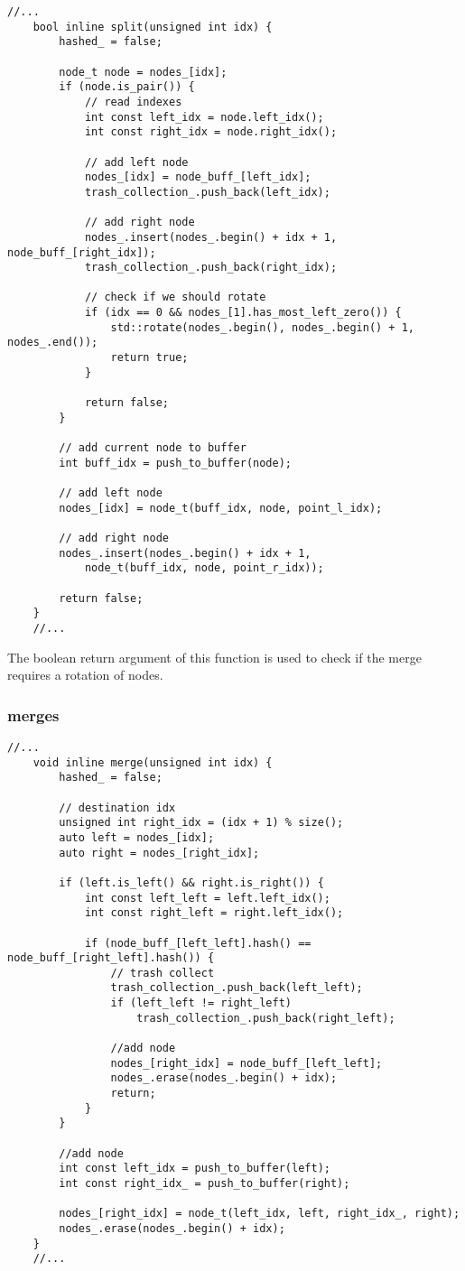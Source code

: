 \documentclass[11pt]{article}
\begin{document}
\begin{lstlisting}[style=CStyle]
	//...
	bool inline split(unsigned int idx) {
		hashed_ = false;

		node_t node = nodes_[idx];
		if (node.is_pair()) {
			// read indexes
			int const left_idx = node.left_idx();
			int const right_idx = node.right_idx();

			// add left node
			nodes_[idx] = node_buff_[left_idx];
			trash_collection_.push_back(left_idx);

			// add right node
			nodes_.insert(nodes_.begin() + idx + 1, node_buff_[right_idx]);
			trash_collection_.push_back(right_idx);

			// check if we should rotate
			if (idx == 0 && nodes_[1].has_most_left_zero()) {
				std::rotate(nodes_.begin(), nodes_.begin() + 1, nodes_.end());
				return true; 
			}

			return false;
		}

		// add current node to buffer
		int buff_idx = push_to_buffer(node);

		// add left node
		nodes_[idx] = node_t(buff_idx, node, point_l_idx);

		// add right node
		nodes_.insert(nodes_.begin() + idx + 1,
			node_t(buff_idx, node, point_r_idx));
		
		return false;
	}
	//...
\end{lstlisting}

The boolean return argument of this function is used to check if the merge requires a rotation of nodes.

\subsubsection{merges}

\begin{lstlisting}[style=CStyle]
	//...
	void inline merge(unsigned int idx) {
		hashed_ = false;

		// destination idx
		unsigned int right_idx = (idx + 1) % size();
		auto left = nodes_[idx];
		auto right = nodes_[right_idx];

		if (left.is_left() && right.is_right()) {
			int const left_left = left.left_idx();
			int const right_left = right.left_idx();

			if (node_buff_[left_left].hash() == node_buff_[right_left].hash()) {
				// trash collect
				trash_collection_.push_back(left_left);
				if (left_left != right_left)
					trash_collection_.push_back(right_left);

				//add node
				nodes_[right_idx] = node_buff_[left_left];
				nodes_.erase(nodes_.begin() + idx);
				return;
			}
		}

		//add node
		int const left_idx = push_to_buffer(left);
		int const right_idx_ = push_to_buffer(right);

		nodes_[right_idx] = node_t(left_idx, left, right_idx_, right);
		nodes_.erase(nodes_.begin() + idx);
	}
	//...
\end{lstlisting}
\end{document}
